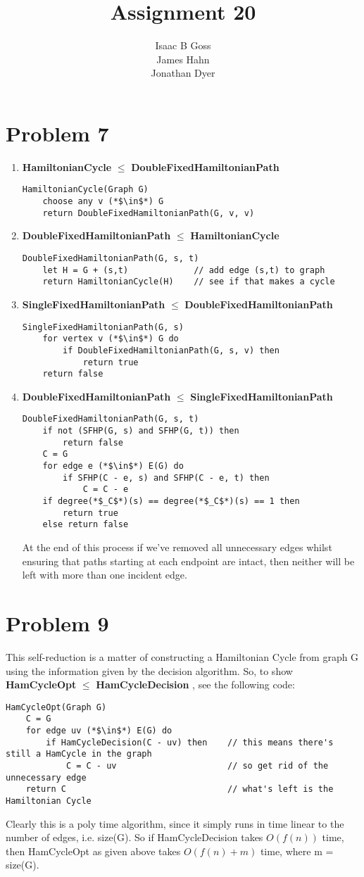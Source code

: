 \documentclass{article}
\author{Isaac B Goss\\ James Hahn\\ Jonathan Dyer}
\title{Assignment 20}
\providecommand{\prob}[1]{\section*{Problem #1}}
\providecommand{\reducible}[2]{
  \textbf{#1} $\leq$ \textbf{#2}
}
\begin{document}
\maketitle
\prob{7}
\begin{enumerate}
  \item \reducible{HamiltonianCycle}{DoubleFixedHamiltonianPath} \\
  \begin{lstlisting}
HamiltonianCycle(Graph G)
    choose any v (*$\in$*) G
    return DoubleFixedHamiltonianPath(G, v, v)
  \end{lstlisting}

  \item \reducible{DoubleFixedHamiltonianPath}{HamiltonianCycle}
  \begin{lstlisting}
DoubleFixedHamiltonianPath(G, s, t)
    let H = G + (s,t)             // add edge (s,t) to graph
    return HamiltonianCycle(H)    // see if that makes a cycle
  \end{lstlisting}

  \item \reducible{SingleFixedHamiltonianPath}{DoubleFixedHamiltonianPath}
  \begin{lstlisting}
SingleFixedHamiltonianPath(G, s)
    for vertex v (*$\in$*) G do
        if DoubleFixedHamiltonianPath(G, s, v) then
            return true
    return false
  \end{lstlisting}

  \item \reducible{DoubleFixedHamiltonianPath}{SingleFixedHamiltonianPath}
  \begin{lstlisting}
DoubleFixedHamiltonianPath(G, s, t)
    if not (SFHP(G, s) and SFHP(G, t)) then
        return false
    C = G
    for edge e (*$\in$*) E(G) do
        if SFHP(C - e, s) and SFHP(C - e, t) then
            C = C - e
    if degree(*$_C$*)(s) == degree(*$_C$*)(s) == 1 then
        return true
    else return false
  \end{lstlisting}
  At the end of this process if we've removed all unnecessary edges whilst ensuring that paths starting at each endpoint are
  intact, then neither will be left with more than one incident edge. 
\end{enumerate}

\prob{9}
This self-reduction is a matter of constructing a Hamiltonian Cycle from graph G using the information given by the decision algorithm.
So, to show \reducible{HamCycleOpt}{HamCycleDecision}, see the following code:
\begin{lstlisting}
HamCycleOpt(Graph G)
    C = G
    for edge uv (*$\in$*) E(G) do
        if HamCycleDecision(C - uv) then    // this means there's still a HamCycle in the graph
            C = C - uv                      // so get rid of the unnecessary edge
    return C                                // what's left is the Hamiltonian Cycle
\end{lstlisting}
Clearly this is a poly time algorithm, since it simply runs in time linear to the number of edges, i.e. size(G). So if HamCycleDecision takes $O(f(n))$ time, then HamCycleOpt as given above takes $O(f(n) + m)$ time, where m = size(G).
\end{document}
